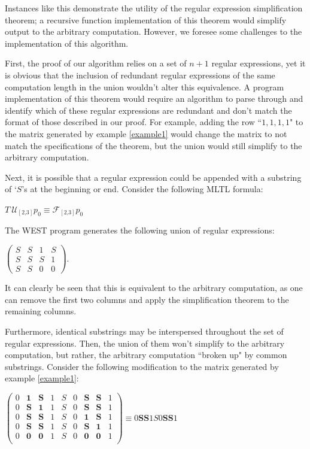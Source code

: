 \documentclass[runningheads]{llncs}
\begin{document}
Instances like this demonstrate the utility of the regular expression simplification theorem; a recursive function implementation of this theorem would simplify output to the arbitrary computation. However, we foresee some challenges to the implementation of this algorithm. 

First, the proof of our algorithm relies on a set of $n+1$ regular expressions, yet it is obvious that the inclusion of redundant regular expressions of the same computation length in the union wouldn't alter this equivalence. A program implementation of this theorem would require an algorithm to parse through and identify which of these regular expressions are redundant and don't match the format of those described in our proof. For example, adding the row ``$1,1,1,1$" to the matrix generated by example \ref{example1} would change the matrix to not match the specifications of the theorem, but the union would still simplify to the arbitrary computation.

Next, it is possible that a regular expression could be appended with a substring of `$S$'s at the beginning or end. Consider the following MLTL formula:
\begin{example} \label{example2}
$T \ \mathcal{U_{[\text{2,3}]}} p_0 \equiv \mathcal{F_{[\text{2,3}]}}p_0$
\end{example}
\noindent The WEST program generates the following union of regular expressions:
\begin{center}
$
    \begin{pmatrix}
    S & S & 1 & S\\
    S & S & S & 1\\
    S & S & 0 & 0
    \end{pmatrix}.
$
\end{center}

It can clearly be seen that this is equivalent to the arbitrary computation, as one can remove the first two columns and apply the simplification theorem to the remaining columns.

Furthermore, identical substrings may be interspersed throughout the set of regular expressions. Then, the union of them won't simplify to the arbitrary computation, but rather, the arbitrary computation ``broken up" by common substrings. Consider the following modification to the matrix generated by example \ref{example1}:
\begin{center}
$
\begin{pmatrix}
  0 & \mathbf{1} & \mathbf{S} & 1 & S & 0 & \mathbf{S} & \mathbf{S} & 1\\
  0 & \mathbf{S} & \mathbf{1} & 1 & S & 0 & \mathbf{S} & \mathbf{S} & 1\\
  0 & \mathbf{S} & \mathbf{S} & 1 & S & 0 & \mathbf{1} & \mathbf{S} & 1\\
  0 & \mathbf{S} & \mathbf{S} & 1 & S & 0 & \mathbf{S} & \mathbf{1} & 1\\
  0 & \mathbf{0} & \mathbf{0} & 1 & S & 0 & \mathbf{0} & \mathbf{0} & 1\\
    \end{pmatrix} \equiv  0\mathbf{S}\mathbf{S}1S0  \mathbf{S}\mathbf{S}1
$
\end{center}
\end{document}

